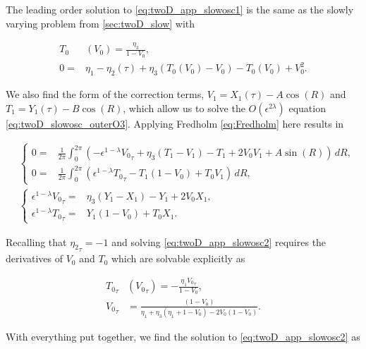 The leading order solution to \eqref{eq:twoD_app_slowosc1} is the same as the slowly varying problem from \autoref{sec:twoD_slow} with

\begin{equation*}
\begin{aligned}
T_0&(V_0)=\frac{\eta_3}{1-V_0},\\
0=& \eta_1-\eta_2(\tau)+\eta_3(T_0(V_0)-V_0)-T_0(V_0)+V_0^2.
\end{aligned}
\end{equation*}

We also find the form of the correction terms, $V_1 = X_1(\tau) -A\cos(R)$ and $T_1 = Y_1(\tau)-B\cos(R)$, which allow us to solve the $O(\epsilon^{2\lambda})$ equation \eqref{eq:twoD_slowosc_outerO3}. Applying Fredholm \eqref{eq:Fredholm} here results in 

\begin{equation}\label{eq:twoD_app_slowosc2}
\begin{aligned}
&\begin{cases}
	0 = & \frac{1}{2\pi}\int_0^{2\pi}\left(-\epsilon^{1-\lambda}{V_0}_\tau+\eta_3(T_1-V_1)-T_1+2V_0V_1+A\sin(R)\right)\,dR,\\
	 0 =& \frac{1}{2\pi}\int_0^{2\pi} \left(\epsilon^{1-\lambda}{T_0}_\tau-T_1(1-V_0)+T_0V_1\right)\,dR,
\end{cases}\\
&\begin{cases}
	\epsilon^{1-\lambda}{V_0}_\tau=&\eta_3(Y_1-X_1)-Y_1+2V_0X_1, \\
	 \epsilon^{1-\lambda}{T_0}_\tau =&  Y_1(1-V_0)+T_0X_1.
\end{cases}
\end{aligned}
\end{equation}

Recalling that ${\eta_2}_\tau=-1$ and solving \eqref{eq:twoD_app_slowosc2} requires the derivatives of $V_0$ and $T_0$ which are solvable explicitly as

\begin{equation*}
\begin{aligned}
{T_0}_\tau&({V_0}_\tau) = -\frac{\eta_1{V_0}_\tau}{1-V_0},\\
{V_0}_\tau &=\frac{(1-V_0)}{\eta_1+\eta_3(\eta_1+1-V_0)-2V_0(1-V_0)}. 
\end{aligned}
\end{equation*}

With everything put together, we find the solution to \eqref{eq:twoD_app_slowosc2} as 

